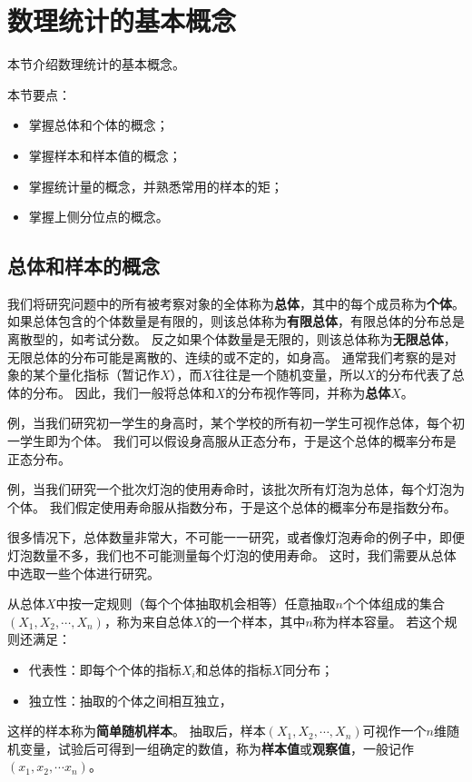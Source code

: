 \section{数理统计的基本概念}

本节介绍数理统计的基本概念。

本节要点：
\begin{itemize}
    \item 掌握总体和个体的概念；
    \item 掌握样本和样本值的概念；
    \item 掌握统计量的概念，并熟悉常用的样本的矩；
    \item 掌握上侧分位点的概念。
\end{itemize}

\subsection{总体和样本的概念}

\begin{definition}[总体和个体]
我们将研究问题中的所有被考察对象的全体称为{\bf 总体}，其中的每个成员称为{\bf 个体}。
如果总体包含的个体数量是有限的，则该总体称为{\bf 有限总体}，有限总体的分布总是离散型的，如考试分数。
反之如果个体数量是无限的，则该总体称为{\bf 无限总体}，无限总体的分布可能是离散的、连续的或不定的，如身高。
通常我们考察的是对象的某个量化指标（暂记作$X$），而$X$往往是一个随机变量，所以$X$的分布代表了总体的分布。
因此，我们一般将总体和$X$的分布视作等同，并称为{\bf 总体$X$}。
\end{definition}

例，当我们研究初一学生的身高时，某个学校的所有初一学生可视作总体，每个初一学生即为个体。
我们可以假设身高服从正态分布，于是这个总体的概率分布是正态分布。

例，当我们研究一个批次灯泡的使用寿命时，该批次所有灯泡为总体，每个灯泡为个体。
我们假定使用寿命服从指数分布，于是这个总体的概率分布是指数分布。

很多情况下，总体数量非常大，不可能一一研究，或者像灯泡寿命的例子中，即便灯泡数量不多，我们也不可能测量每个灯泡的使用寿命。
这时，我们需要从总体中选取一些个体进行研究。

\begin{definition}[样本和样本值]
从总体$X$中按一定规则（每个个体抽取机会相等）任意抽取$n$个个体组成的集合$\left( X_1,X_2,\cdots ,X_n \right) $，称为来自总体$X$的一个样本，其中$n$称为样本容量。
若这个规则还满足：
\begin{itemize}
    \item 代表性：即每个个体的指标$X_i$和总体的指标$X$同分布；
    \item 独立性：抽取的个体之间相互独立，
\end{itemize}
这样的样本称为{\bf 简单随机样本}。
抽取后，样本$\left( X_1,X_2,\cdots ,X_n \right) $可视作一个$n$维随机变量，试验后可得到一组确定的数值，称为{\bf 样本值}或{\bf 观察值}，一般记作$\left( x_1,x_2,\cdots x_n \right) $。
\end{definition}

